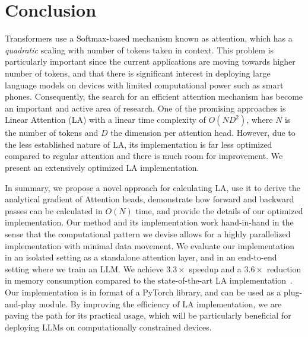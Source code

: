 \section{Conclusion}
Transformers use a Softmax-based mechanism known as attention, which has a \textit{quadratic} scaling with number of tokens taken in context. This problem is particularly important since the current applications are moving towards higher number of tokens, and that there is significant interest in deploying large language models on devices with limited computational power such as smart phones. Consequently, the search for an efficient attention mechanism has become an important and active area of research. One of the promising approaches is Linear Attention (LA) with a linear time complexity of $O(ND^2)$, where $N$ is the number of tokens and $D$ the dimension per attention head. However, due to the less established nature of LA, its implementation is far less optimized compared to regular attention and there is much room for improvement. We present an extensively optimized LA implementation.

\par In summary, we propose a novel approach for calculating LA, use it to derive the analytical gradient of Attention heads, demonstrate how forward and backward passes can be calculated in $O(N)$ time, and provide the details of our optimized implementation. Our method and its implementation work hand-in-hand in the sense that the computational pattern we devise allows for a highly parallelized implementation with minimal data movement. We evaluate our implementation in an isolated setting as a standalone attention layer, and in an end-to-end setting where we train an LLM. We achieve $3.3\times$ speedup and a $3.6\times$ reduction in memory consumption compared to the state-of-the-art LA implementation~\cite{yang2023gated}. Our implementation is in format of a PyTorch library, and can be used as a plug-and-play module. By improving the efficiency of LA implementation, we are paving the path for its practical usage, which will be particularly beneficial for deploying LLMs on computationally constrained devices. 

